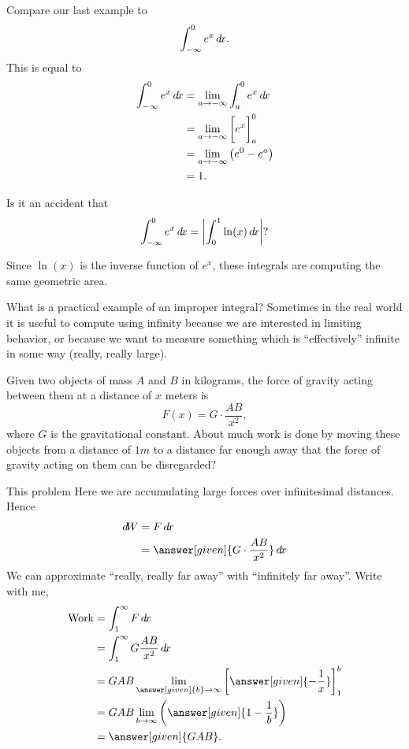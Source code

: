 \documentclass{ximera}
\begin{document}
Compare our last example to
\[
\int_{-\infty}^0 e^x \mathop{}\!d\! x.
\]
This is equal to
\begin{align*}
  \int_{-\infty}^0 e^x \mathop{}\!d\! x &= \lim_{a\to -\infty} \int_a^0 e^x \mathop{}\!d\! x\\
  &= \lim_{a\to-\infty}\bigg[ e^x \bigg]_{a}^0 \\
  &= \lim_{a\to-\infty}\left(e^0 - e^a\right) \\
  &=1.
\end{align*}


\begin{question}
  Is it an accident that
  \[
  \int_{-\infty}^0 e^x \mathop{}\!d\! x = \left| \int_0^1 \ln(x)\mathop{}\!d\! x \right|?
  \]
  \begin{prompt}
  \begin{multipleChoice}
  \end{multipleChoice}
  \begin{feedback}
    Since $\ln(x)$ is the inverse function of $e^x$, these integrals
    are computing the same geometric area.
  \end{feedback}
  \end{prompt}
\end{question}


What is a practical example of an improper integral?  Sometimes in the
real world it is useful to compute using infinity because we are
interested in limiting behavior, or because we want to measure
something which is ``effectively'' infinite in some way (really, really
large).

\begin{example}
  Given two objects of mass $A$ and $B$ in kilograms, the force of
  gravity acting between them at a distance of $x$ meters is
  \[
  F(x) = G\cdot \frac{AB}{x^2},
  \]
  where $G$ is the gravitational constant.  About much work is done by
  moving these objects from a distance of $1 \unit{m}$ to a distance
  far enough away that the force of gravity acting on them can be
  disregarded?
  \begin{explanation}
    This problem Here we are accumulating large forces over
    infinitesimal distances. Hence
    \begin{align*}
      \d W &= F \d x\\
      &= \answer[given]{G\cdot \frac{AB}{x^2}} \d x
    \end{align*}
    We can approximate ``really, really far away'' with ``infinitely far away''. Write with me,
    \begin{align*}
      \textrm{Work} &= \int_1^\infty F \d x\\
      &= \int_1^\infty G\frac{AB}{x^2} \d x\\
      &= GAB \lim_{\answer[given]{b} \to \infty} \eval{\answer[given]{-\frac{1}{x}}}_1^b\\
      &=GAB \lim_{b \to \infty} \left(\answer[given]{1 - \frac{1}{b}}\right)\\
      &=\answer[given]{GAB}.
    \end{align*}
  \end{explanation}
\end{example}
\end{document}
